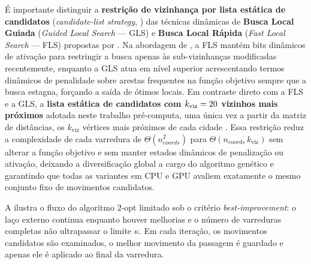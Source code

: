 É importante distinguir a \textbf{restrição de vizinhança por lista estática de candidatos} (\emph{candidate-list strategy}, \textcite{lin1973efficient}) das técnicas dinâmicas de \textbf{Busca Local Guiada} (\emph{Guided Local Search} --- GLS) e \textbf{Busca Local Rápida} (\emph{Fast Local Search} --- FLS) propostas por \textcite{voudouris1999tsp}.
Na abordagem de \textcite{voudouris1999tsp}, a FLS mantém bits dinâmicos de ativação para restringir a busca apenas às sub-vizinhanças modificadas recentemente, enquanto a GLS atua em nível superior acrescentando termos dinâmicos de penalidade sobre arestas frequentes na função objetivo sempre que a busca estagna, forçando a saída de ótimos locais.
Em contraste direto com a FLS e a GLS, a \textbf{lista estática de candidatos com \(k_{\text{viz}} = 20\) vizinhos mais próximos} adotada neste trabalho pré-computa, uma única vez a partir da matriz de distâncias, os \(k_{\text{viz}}\) vértices mais próximos de cada cidade \autocite{lin1973efficient}.
Essa restrição reduz a complexidade de cada varredura de \(\Theta(n_{coords}^2)\) para \(\Theta(n_{coords}\,k_{\text{viz}})\) sem alterar a função objetivo e sem manter estados dinâmicos de penalização ou ativação, deixando a diversificação global a cargo do algoritmo genético e garantindo que todas as variantes em CPU e GPU avaliem exatamente o mesmo conjunto fixo de movimentos candidatos.

A  ilustra o fluxo do algoritmo \(2\)-opt limitado sob o critério \emph{best-improvement}: o laço externo continua enquanto houver melhorias e o número de varreduras completas não ultrapassar o limite \(\kappa\).
Em cada iteração, os movimentos candidatos são examinados, o melhor movimento da passagem é guardado e apenas ele é aplicado ao final da varredura.

